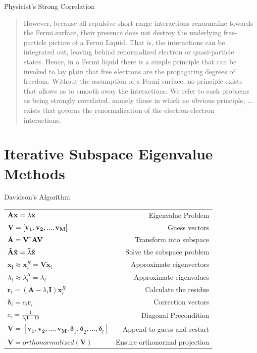 \documentclass[10pt]{beamer}
\begin{document}
{{{{{{{{{{{{{{{{
\begin{frame}{Physicist's Strong Correlation}
  \centering
	\begin{quote}
  	However, because all repulsive short-range interactions renormalize towards the Fermi surface, 
  	their presence does not destroy the underlying free-particle picture of a Fermi Liquid. That 
  	is, the interactions can be integrated out, leaving behind renormalized electron or 
  	quasi-particle states. Hence, in a Fermi liquid there is a simple principle that can be invoked 
  	to lay plain that free electrons are the propagating degrees of freedom. Without the assumption 
  	of a Fermi surface, no principle exists that allows us to smooth away the interactions. 
  	\alert{We 
  	refer to such problems as being strongly correlated, namely those in which no obvious 
  	principle, ... exists that governs the renormalization of the electron-electron interactions.} 
	\end{quote}
	
\end{frame}

\section{Iterative Subspace Eigenvalue Methods}
{%
\begin{frame}{Davidson's Algorithm}
  \begin{tabular}{l r}
    $\bf{Ax}=\lambda\bf{x}$         & Eigenvalue Problem \\
    $\bf{V}=[\bf{v_1,v_2,...,v_M}]$	& Guess vectors \\
    $\bf{\tilde{A}} = \bf{V}^\dag\bf{AV}$  & Transform into subspace\\ 
    $\bf{\tilde{A}\tilde{x}}=\tilde{\lambda}\bf{\tilde{x}}$ & Solve the subspace problem\\
  	$\mathbf{x_i} \approx \mathbf{x}_i^R = \mathbf{V\tilde{x}}_i$ & Approximate eigenvectors\\
  	$\lambda_i \approx \lambda_i^R = \tilde{\lambda}_i$ & Approximate eigenvalues \\
    $\mathbf{r}_i=\left(\mathbf{A}-\lambda_i\mathbf{I}\right)\mathbf{x}_i^R $ & Calculate the 
    residue \\
    $\mathbf{\delta}_i = c_i\mathbf{r}_i$ & Correction vectors \\
    $c_i = \frac{1}{\lambda_i\mathbf{I}-\mathbf{D}}$ & Diagonal Precondition \\
    $\mathbf{V} = 
    [\mathbf{v_1,v_2,...,v_M}\mathbf{,\delta}_1\mathbf{,\delta}_2,...\mathbf{,\delta}_l]$ & Append 
    to guess and restart \\ 
    $\mathbf{V} = orthonormalized(\mathbf{V})$ & Ensure orthonormal projection
  \end{tabular}
\end{frame}

}}}}}}}}}}}}}}}}}
\end{document}
